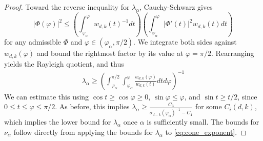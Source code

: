 \documentclass[11pt]{amsart}
\numberwithin{equation}{section}
\numberwithin{figure}{section}
\theoremstyle{plain}
\theoremstyle{definition}
\theoremstyle{remark}
\theoremstyle{plain}
\begin{document}
\begin{proof}
    Toward the reverse inequality for $\lambda_\alpha$, Cauchy-Schwarz gives
    \begin{equation*}
        |\Phi(\varphi)|^2 \leq \left(\int_{\varphi_\alpha}^{\varphi} w_{d,k}(t)^{-1}dt\right)\left(\int_{\varphi_\alpha}^{\varphi}|\Phi'(t)|^2w_{d,k}(t)dt\right)
    \end{equation*}
    for any admissible $\Phi$ and $\varphi\in (\varphi_\alpha, \pi/2)$. We integrate both sides against $w_{d,k}(\varphi)$ and bound the rightmost factor by its value at $\varphi = \pi/2$. Rearranging yields the Rayleigh quotient, and thus
    \begin{align*}
        \lambda_\alpha \geq \left(\int_{\varphi_\alpha}^{\pi/2}\int_{\varphi_\alpha}^{\varphi}  \frac{w_{d,k}(\varphi)}{w_{d,k}(t)}dtd\varphi\right)^{-1}
    \end{align*}
    We can estimate this using $\cos t \geq \cos\varphi \geq 0$, $\sin\varphi \leq \varphi$, and $\sin t \geq t/2$, since $0 \leq t \leq\varphi\leq \pi/2$. As before, this implies $\lambda_\alpha \geq \frac{C_3}{\sigma_{d-k}(\varphi_\alpha)^{-1} - C_4}$ for some $C_i(d,k)$, which implies the lower bound for $\lambda_\alpha$ once $\alpha$ is sufficiently small. The bounds for $\nu_\alpha$ follow directly from applying the bounds for $\lambda_\alpha$ to \eqref{eq:cone_exponent}.

\end{proof}
\end{document}
